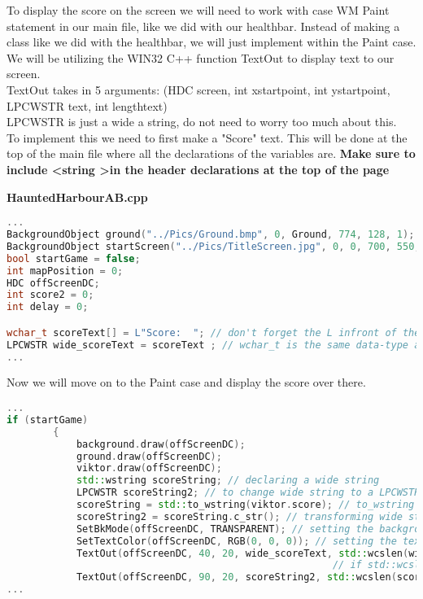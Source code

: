 \documentclass[11pt]{article}
\begin{document}
To display the score on the screen we will need to work with case WM \textunderscore Paint statement in our main file, like we did with our healthbar. Instead of making a class like we did with the healthbar, we will just implement within the Paint case. We will be utilizing the WIN32 C++ function TextOut to display text to our screen. 
\\
TextOut takes in 5 arguments: (HDC screen, int xstartpoint, int ystartpoint, LPCWSTR text, int lengthtext) 
\\
LPCWSTR is just a wide a string, do not need to worry too much about this. 
\\ 
To implement this we need to first make a "Score" text. This will be done at the top of the main file where all the declarations of the variables are.  
\smallskip
\textbf{Make sure to include \textless string \textgreater in the header declarations at the top of the page}

\bigskip
\textbf{HauntedHarbourAB.cpp}
\smallskip 

\begin{lstlisting}[language=C++]  
... 
BackgroundObject ground("../Pics/Ground.bmp", 0, Ground, 774, 128, 1);
BackgroundObject startScreen("../Pics/TitleScreen.jpg", 0, 0, 700, 550, 0);
bool startGame = false;
int mapPosition = 0;
HDC offScreenDC;
int score2 = 0; 
int delay = 0; 

wchar_t scoreText[] = L"Score:  "; // don't forget the L infront of the string
LPCWSTR wide_scoreText = scoreText ; // wchar_t is the same data-type as LPCWSTR but TextOut only takes LPCWSTR 
...
\end{lstlisting}   


Now we will move on to the Paint case and display the score over there. 
\smallskip

\begin{lstlisting}[language=C++]  
...
if (startGame)
		{
			background.draw(offScreenDC);
			ground.draw(offScreenDC);
			viktor.draw(offScreenDC); 
			std::wstring scoreString; // declaring a wide string 
			LPCWSTR scoreString2; // to change wide string to a LPCWSTR
			scoreString = std::to_wstring(viktor.score); // to_wstring function takes in an int
			scoreString2 = scoreString.c_str(); // transforming wide string to LPCWSTR
			SetBkMode(offScreenDC, TRANSPARENT); // setting the background of the text to transparent, default it is an ugly white
			SetTextColor(offScreenDC, RGB(0, 0, 0)); // setting the text colour to black 
			TextOut(offScreenDC, 40, 20, wide_scoreText, std::wcslen(wide_scoreText); // displaying "Score: "
														// if std::wcslen(wide_scoreText) is not working then put 8 instead
			TextOut(offScreenDC, 90, 20, scoreString2, std::wcslen(scoreString2)); // displaying continous changing score of victor to the right of the scoreText. 
...
\end{lstlisting}  
 
\end{document}
